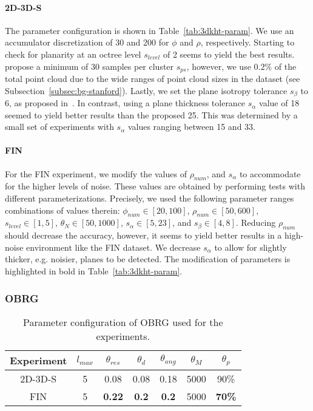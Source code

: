 \documentclass[main.tex]{subfiles}
\begin{document}
\paragraph{2D-3D-S}
The parameter configuration is shown in Table~\ref{tab:3dkht-param}. We use an accumulator discretization of 30 and 200 for $\phi$ and $\rho$, respectively.
Starting to check for planarity at an octree level $s_{level}$ of 2 seems to yield the best results.
\citeauthor{LimbergerOliveira2015HT3D}\cite{LimbergerOliveira2015HT3D} propose
a minimum of 30 samples per cluster $s_{ps}$, however, we use $0.2\%$ of the total point cloud due to the wide ranges of point cloud sizes in the dataset (see Subsection~\ref{subsec:bg-stanford}).
Lastly, we set the plane isotropy tolerance $s_\beta$ to 6, as proposed in~\cite[Section~3.1]{LimbergerOliveira2015HT3D}.
In contrast, using a plane thickness tolerance $s_\alpha$ value of 18 seemed to yield better results than the proposed 25.
This was determined by a small set of experiments with $s_\alpha$ values ranging between 15 and 33.

\paragraph{FIN}
For the FIN experiment, we modify the values of $\rho_{num}$, and $s_\alpha$ to accommodate for the higher levels of noise.
These values are obtained by performing tests with different parameterizations. Precisely, we used the following parameter ranges
combinations of values therein:
$\phi_{num} \in [20, 100]$, $\rho_{num} \in [50, 600]$, $s_{level}\in[1, 5]$, $\theta_N \in [50, 1000]$, $s_\alpha \in [5, 23]$, and $s_\beta \in [4, 8]$.
Reducing $\rho_{num}$ should decrease the accuracy, however, it seems to yield better results in a high-noise environment like the FIN dataset.
We decrease $s_\alpha$ to allow for slightly thicker, e.g. noisier, planes to be detected.
The modification of parameters is highlighted in bold in Table~\ref{tab:3dkht-param}.


\subsubsection{OBRG}
\begin{table}[H]
    \centering
    \begin{tabular}{c|cccccc}
        Experiment & $l_{max}$ & $\theta_{res}$ & $\theta_{d}$ & $\theta_{ang}$ & $\theta_M$ & $\theta_p$    \\ \hline
        2D-3D-S    & 5         & 0.08           & 0.08         & 0.18           & 5000       & 90\%          \\
        FIN        & 5         & \textbf{0.22}  & \textbf{0.2} & \textbf{0.2}   & 5000       & \textbf{70\%}
    \end{tabular}
    \caption{Parameter configuration of OBRG used for the experiments.}
    \label{tab:obrg-param}
\end{table}
\end{document}
